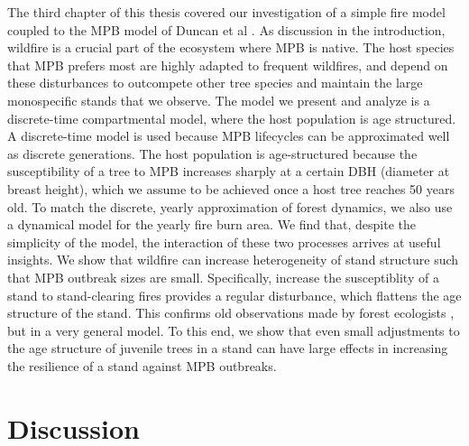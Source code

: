 The third chapter of this thesis covered our investigation of a simple fire model coupled to the MPB model of Duncan et al \cite{duncan2015model}. As discussion in the introduction, wildfire is a crucial part of the ecosystem where MPB is native. The host species that MPB prefers most are highly adapted to frequent wildfires, and depend on these disturbances to outcompete other tree species and maintain the large monospecific stands that we observe. The model we present and analyze is a discrete-time compartmental model, where the host population is age structured. A discrete-time model is used because MPB lifecycles can be approximated well as discrete generations. The host population is age-structured because the susceptibility of a tree to MPB increases sharply at a certain DBH (diameter at breast height), which we assume to be achieved once a host tree reaches 50 years old. To match the discrete, yearly approximation of forest dynamics, we also use a dynamical model for the yearly fire burn area. We find that, despite the simplicity of the model, the interaction of these two processes arrives at useful insights. We show that wildfire can increase heterogeneity of stand structure such that MPB outbreak sizes are small. Specifically, increase the susceptiblity of a stand to stand-clearing fires provides a regular disturbance, which flattens the age structure of the stand. This confirms old observations made by forest ecologists \cite{kaufmann2008status, seidl2016spatial}, but in a very general model. To this end, we show that even small adjustments to the age structure of juvenile trees in a stand can have large effects in increasing the resilience of a stand against MPB outbreaks.     


\section{Discussion}

